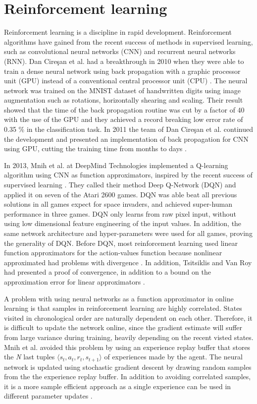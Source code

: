 \documentclass[class=book, crop=false]{standalone}
\begin{document}
\section{Reinforcement learning}
Reinforcement learning is a discipline in rapid development. Reinforcement algorithms have gained from the recent success of methods in supervised learning, such as convolutional neural networks (CNN) and  recurrent neural networks (RNN). Dan Cire\c{s}an et al. had a breakthrough in 2010 when they were able to train a dense neural network using back propagation with a graphic processor unit (GPU) instead of a conventional central processor unit (CPU) \cite{DNN_gpu_2010}. The neural network was trained on the MNIST dataset of handwritten digits using image augmentation such as rotations, horizontally shearing and scaling. Their result showed that the time of the back propagation routine was cut by a factor of 40 with the use of the GPU and they achieved a record breaking low error rate of 0.35 \% in the classification task. In 2011 the team of Dan Cire\c{s}an et al. continued the development and presented an implementation of back propagation for CNN using GPU, cutting the training time from months to days \cite{CNN_gpu_2011}.

In 2013, Mnih et al. at DeepMind Technologies implemented a Q-learning algorithm using CNN as function approximators, inspired by the recent success of supervised learning \cite{DQN_Mnih_et_al_2013}. They called their method Deep Q-Network (DQN) and applied it on seven of the Atari 2600 games. DQN was able beat all previous solutions in all games expect for space invaders, and achieved super-human performance in three games. DQN only learns from raw pixel input, without using low dimensional feature engineering of the input values. In addition, the same network architecture and hyper-parameters were used for all games, proving the generality of DQN. Before DQN, most reinforcement learning used linear function approximators for the action-values function because nonlinear approximated had problems with divergence \cite{DQN_Mnih_et_al_2013}. In addition, Tsitsiklis and Van Roy had presented a proof of convergence, in addition to a bound on the approximation error for linear approximators \cite{linear_stable_Tsitsiklis97}.

A problem with using neural networks as a function approximator in online learning is that samples in reinforcement learning are highly correlated. States visited in chronological order are naturally dependent on each other. Therefore, it is difficult to update the network online, since the gradient estimate will suffer from large variance during training, heavily depending on the recent visted states. Mnih et al. avoided this problem by using an experience replay buffer that stores the \textit{N} last tuples $\langle s_{t}, a_{t}, r_{t}, s_{t+1}\rangle$ of experiences made by the agent. The neural network is updated using stochastic gradient descent by drawing random samples from the the experience replay buffer. In addition to avoiding correlated samples, it is a more sample efficient approach as a single experience can be used in different parameter updates \cite{DQN_Mnih_et_al_2013}.
\end{document}
